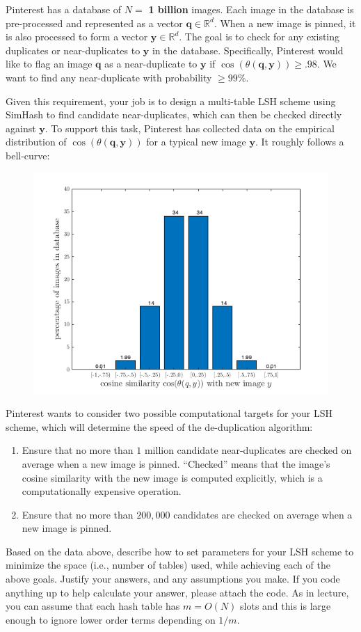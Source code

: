 \documentclass[10pt]{article}
\newcommand{\bv}[1]{\mathbf{#1}}
\newcommand{\R}{\mathbb{R}}
\begin{document}
Pinterest has a database of $N = $ \textbf{1 billion} images. Each image in the database is pre-processed and represented as a vector $\bv{q}\in \R^d$. When a new image is pinned, it is also processed to form a vector $\bv{y} \in \R^d$. The goal is to check for any existing duplicates or near-duplicates to $\bv{y}$ in the database.  
Specifically, Pinterest would like to flag an image $\bv{q}$ as a near-duplicate to $\bv{y}$ if $\cos(\theta(\bv{q},\bv{y})) \geq .98$. We want to find any near-duplicate with probability $\geq 99\%$. 

Given this requirement, your job is to design a multi-table LSH scheme using SimHash to find candidate near-duplicates, which can then be checked directly against $\bv{y}$. To support this task, Pinterest has collected data on the empirical distribution of $\cos(\theta(\bv{q},\bv{y}))$ for a typical new image $\bv{y}$. It roughly follows a bell-curve:

\begin{figure}[H]
	\centering
	\includegraphics[width=.6\textwidth]{dist.png}
\end{figure} 

Pinterest wants to consider two possible computational targets for your LSH scheme, which will determine the speed of the de-duplication algorithm:
\begin{enumerate}
	\item Ensure that no more than $1$ million candidate near-duplicates are checked on average when a new image is pinned. ``Checked'' means that the image's cosine similarity with the new image is computed explicitly, which is a computationally expensive operation.
	\item Ensure that no more than $200,000$ candidates are checked on average when a new image is pinned.
\end{enumerate}

\noindent Based on the data above, describe how to set parameters for your LSH scheme to minimize the space (i.e., number of tables) used, while achieving each of the above goals. Justify your answers, and any assumptions you make.
If you code anything up to help calculate your answer, please attach the code. As in lecture, you can assume that each hash table has $m = O(N)$ slots and this is large enough to ignore lower order terms depending on $1/m$. 
\end{document}

